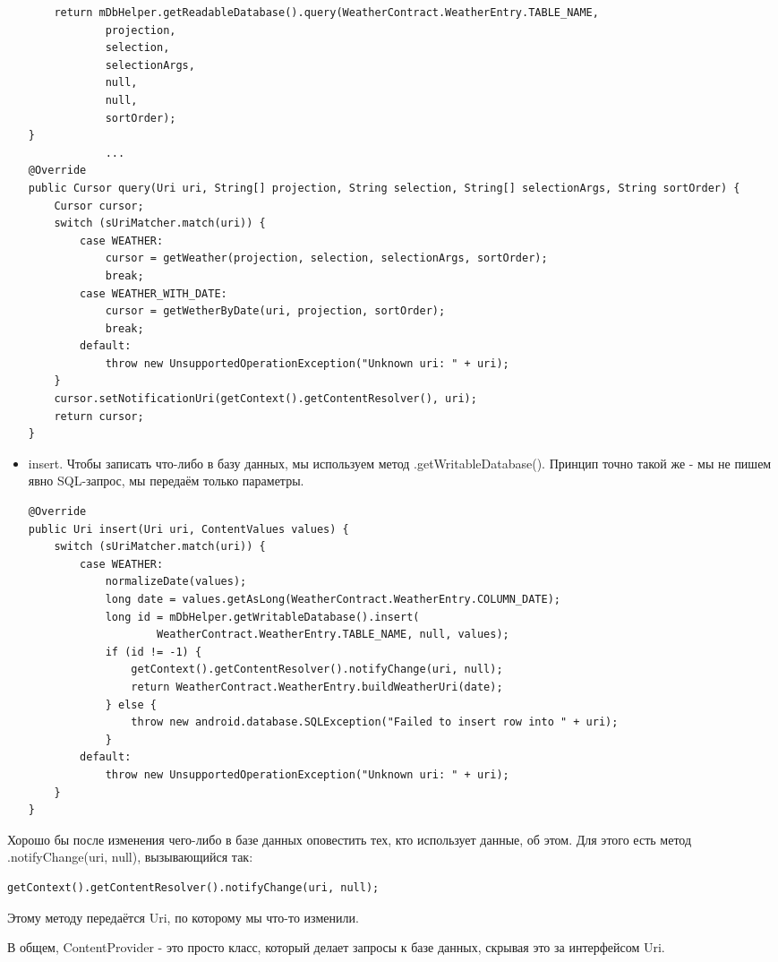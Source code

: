 \documentclass[12 pt]{article}
\begin{document}
\begin{itemize}
\begin{lstlisting}
    return mDbHelper.getReadableDatabase().query(WeatherContract.WeatherEntry.TABLE_NAME,
            projection,
            selection,
            selectionArgs,
            null,
            null,
            sortOrder);
}
            ...           
@Override
public Cursor query(Uri uri, String[] projection, String selection, String[] selectionArgs, String sortOrder) {
    Cursor cursor;
    switch (sUriMatcher.match(uri)) {
        case WEATHER:
            cursor = getWeather(projection, selection, selectionArgs, sortOrder);
            break;
        case WEATHER_WITH_DATE:
            cursor = getWetherByDate(uri, projection, sortOrder);
            break;
        default:
            throw new UnsupportedOperationException("Unknown uri: " + uri);
    }
    cursor.setNotificationUri(getContext().getContentResolver(), uri);
    return cursor;
}    	
    	\end{lstlisting}
	    \item insert. Чтобы записать что-либо в базу данных, мы используем метод .getWritableDatabase(). Принцип точно такой же - мы не пишем явно SQL-запрос, мы передаём только параметры.
	    \begin{lstlisting}
@Override
public Uri insert(Uri uri, ContentValues values) {
    switch (sUriMatcher.match(uri)) {
        case WEATHER:
            normalizeDate(values);
            long date = values.getAsLong(WeatherContract.WeatherEntry.COLUMN_DATE);
            long id = mDbHelper.getWritableDatabase().insert(
                    WeatherContract.WeatherEntry.TABLE_NAME, null, values);
            if (id != -1) {
                getContext().getContentResolver().notifyChange(uri, null);
                return WeatherContract.WeatherEntry.buildWeatherUri(date);
            } else {
                throw new android.database.SQLException("Failed to insert row into " + uri);
            }
        default:
            throw new UnsupportedOperationException("Unknown uri: " + uri);
    }
}	    
	    \end{lstlisting}
	\end{itemize}
	Хорошо бы после изменения чего-либо в базе данных оповестить тех, кто использует данные, об этом. Для этого есть метод .notifyChange(uri, null), вызывающийся так:
    \begin{lstlisting}
getContext().getContentResolver().notifyChange(uri, null);    
    \end{lstlisting} Этому методу передаётся Uri, по которому мы что-то изменили.
    
    В общем, ContentProvider - это просто класс, который делает запросы к базе данных, скрывая это за интерфейсом Uri.
    
\end{document}

